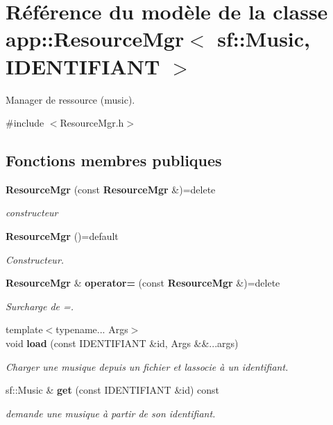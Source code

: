 \section{Référence du modèle de la classe app\+:\+:Resource\+Mgr$<$ sf\+:\+:Music, I\+D\+E\+N\+T\+I\+F\+I\+A\+N\+T $>$}
\label{classapp_1_1_resource_mgr_3_01sf_1_1_music_00_01_i_d_e_n_t_i_f_i_a_n_t_01_4}


Manager de ressource (music).  




{\ttfamily \#include $<$Resource\+Mgr.\+h$>$}

\subsection*{Fonctions membres publiques}
\begin{DoxyCompactItemize}
\item 
{\bf Resource\+Mgr} (const {\bf Resource\+Mgr} \&)=delete
\begin{DoxyCompactList}\small\item\em constructeur \end{DoxyCompactList}\item 
{\bf Resource\+Mgr} ()=default
\begin{DoxyCompactList}\small\item\em Constructeur. \end{DoxyCompactList}\item 
{\bf Resource\+Mgr} \& {\bf operator=} (const {\bf Resource\+Mgr} \&)=delete
\begin{DoxyCompactList}\small\item\em Surcharge de =. \end{DoxyCompactList}\item 
{\footnotesize template$<$typename... Args$>$ }\\void {\bf load} (const I\+D\+E\+N\+T\+I\+F\+I\+A\+N\+T \&id, Args \&\&...args)
\begin{DoxyCompactList}\small\item\em Charger une musique depuis un fichier et l\textquotesingle{}associe à un identifiant. \end{DoxyCompactList}\item 
sf\+::\+Music \& {\bf get} (const I\+D\+E\+N\+T\+I\+F\+I\+A\+N\+T \&id) const 
\begin{DoxyCompactList}\small\item\em demande une musique à partir de son identifiant. \end{DoxyCompactList}\end{DoxyCompactItemize}
